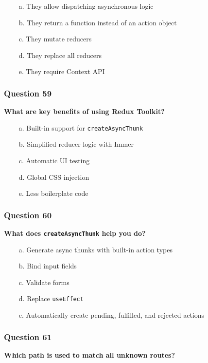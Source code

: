 \documentclass{article}
\newcommand{\cmark}{\textcolor{green}{\ding{51}}} %
\newcommand{\xmark}{\textcolor{red}{\ding{55}}}   %
\begin{document}
\begin{itemize}
  \item[\cmark\ a.] They allow dispatching asynchronous logic
  \item[\cmark\ b.] They return a function instead of an action object
  \item[\xmark\ c.] They mutate reducers
  \item[\xmark\ d.] They replace all reducers
  \item[\xmark\ e.] They require Context API
\end{itemize}

\subsubsection*{Question 59}
\textbf{What are key benefits of using Redux Toolkit?}

\begin{itemize}
  \item[\cmark\ a.] Built-in support for \texttt{createAsyncThunk}
  \item[\cmark\ b.] Simplified reducer logic with Immer
  \item[\xmark\ c.] Automatic UI testing
  \item[\xmark\ d.] Global CSS injection
  \item[\cmark\ e.] Less boilerplate code
\end{itemize}

\subsubsection*{Question 60}
\textbf{What does \texttt{createAsyncThunk} help you do?}

\begin{itemize}
  \item[\cmark\ a.] Generate async thunks with built-in action types
  \item[\xmark\ b.] Bind input fields
  \item[\xmark\ c.] Validate forms
  \item[\xmark\ d.] Replace \texttt{useEffect}
  \item[\cmark\ e.] Automatically create pending, fulfilled, and rejected actions
\end{itemize}

\subsubsection*{Question 61}
\textbf{Which path is used to match all unknown routes?}
\end{document}
